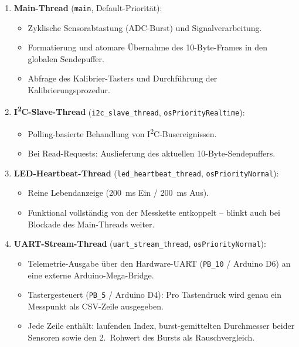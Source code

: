 \begin{enumerate}
  \item \textbf{Main-Thread} (\texttt{main}, Default-Priorität):
    \begin{itemize}
      \item Zyklische Sensorabtastung (ADC-Burst) und Signalverarbeitung.
      \item Formatierung und atomare Übernahme des 10-Byte-Frames in den globalen Sendepuffer.
      \item Abfrage des Kalibrier-Tasters und Durchführung der Kalibrierungsprozedur.
    \end{itemize}
  \item \textbf{I\textsuperscript{2}C-Slave-Thread} (\texttt{i2c\_slave\_thread}, \texttt{osPriorityRealtime}):
    \begin{itemize}
      \item Polling-basierte Behandlung von I\textsuperscript{2}C-Busereignissen.
      \item Bei Read-Requests: Auslieferung des aktuellen 10-Byte-Sendepuffers.
    \end{itemize}
  \item \textbf{LED-Heartbeat-Thread} (\texttt{led\_heartbeat\_thread}, \texttt{osPriorityNormal}):
    \begin{itemize}
      \item Reine Lebendanzeige (\qty{200}{\milli\second} Ein / \qty{200}{\milli\second} Aus).
      \item Funktional vollständig von der Messkette entkoppelt -- blinkt auch bei Blockade des Main-Threads weiter.
    \end{itemize}
  \item \textbf{UART-Stream-Thread} (\texttt{uart\_stream\_thread}, \texttt{osPriorityNormal}):
    \begin{itemize}
      \item Telemetrie-Ausgabe über den Hardware-UART (\texttt{PB\_10} / Arduino D6) an eine externe Arduino-Mega-Bridge.
      \item Tastergesteuert (\texttt{PB\_5} / Arduino D4): Pro Tastendruck wird genau ein Messpunkt als CSV-Zeile ausgegeben.
      \item Jede Zeile enthält: laufenden Index, burst-gemittelten Durchmesser beider Sensoren sowie den 2.~Rohwert des Bursts als Rauschvergleich.
    \end{itemize}
\end{enumerate}

